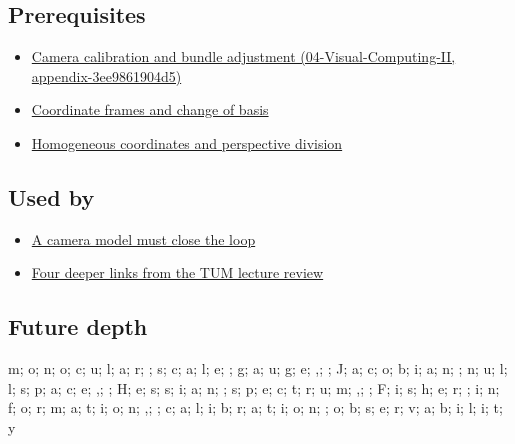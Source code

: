 \subsection{Prerequisites}\label{prerequisites}

\begin{itemize}
\tightlist
\item
  \href{}{Camera calibration and bundle adjustment (04-Visual-Computing-II, appendix-3ee9861904d5)}
\item
  \hyperref[appendix-1bae9457dbc3]{Coordinate frames and change of basis}
\item
  \hyperref[appendix-cb3b26862282]{Homogeneous coordinates and perspective division}
\end{itemize}

\subsection{Used by}\label{used-by}

\begin{itemize}
\tightlist
\item
  \href{Continuous\%20Notes/Computing\%20Foundations\%20-\%20From\%20Bits\%20to\%20C++\%20and\%20Systems\%20APIs\#A\%20camera\%20model\%20must\%20close\%20the\%20loop}{A camera model must close the loop}
\item
  \href{Continuous\%20Notes/Computing\%20Foundations\%20-\%20From\%20Bits\%20to\%20C++\%20and\%20Systems\%20APIs\#Four\%20deeper\%20links\%20from\%20the\%20TUM\%20lecture\%20review}{Four deeper links from the TUM lecture review}
\end{itemize}

\subsection{Future depth}\label{future-depth}

m; o; n; o; c; u; l; a; r; ; s; c; a; l; e; ; g; a; u; g; e; ,; ; J; a; c; o; b; i; a; n; ; n; u; l; l; s; p; a; c; e; ,; ; H; e; s; s; i; a; n; ; s; p; e; c; t; r; u; m; ,; ; F; i; s; h; e; r; ; i; n; f; o; r; m; a; t; i; o; n; ,; ; c; a; l; i; b; r; a; t; i; o; n; ; o; b; s; e; r; v; a; b; i; l; i; t; y
